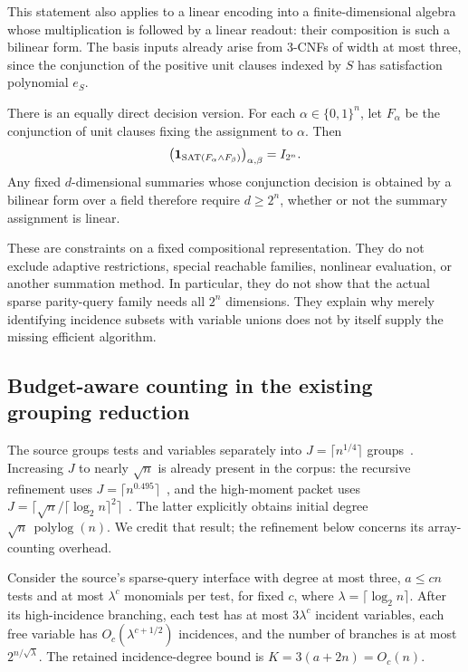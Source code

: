 This statement also applies to a linear encoding into a finite-dimensional
algebra whose multiplication is followed by a linear readout: their
composition is such a bilinear form. The basis inputs already arise from
3-CNFs of width at most three, since the conjunction of the positive unit
clauses indexed by $S$ has satisfaction polynomial $e_S$.

There is an equally direct decision version. For each
$\alpha\in\{0,1\}^n$, let $F_\alpha$ be the conjunction of unit clauses
fixing the assignment to $\alpha$. Then
\[
 \bigl(\mathbf1_{\operatorname{SAT}(F_\alpha\wedge F_\beta)}\bigr)_{\alpha,\beta}
 =I_{2^n}.
\]
Any fixed $d$-dimensional summaries whose conjunction decision is obtained
by a bilinear form over a field therefore require $d\ge2^n$, whether or not
the summary assignment is linear.

These are constraints on a fixed compositional representation. They do not
exclude adaptive restrictions, special reachable families, nonlinear
evaluation, or another summation method. In particular, they do not show
that the actual sparse parity-query family needs all $2^n$ dimensions.
They explain why merely identifying incidence subsets with variable unions
does not by itself supply the missing efficient algorithm.

\subsection{Budget-aware counting in the existing grouping reduction}

The source groups tests and variables separately into
$J=\lceil n^{1/4}\rceil$ groups~\cite{openai}. Increasing $J$ to nearly
$\sqrt n$ is already present in the corpus: the recursive refinement uses
$J=\lceil n^{0.495}\rceil$~\cite{recursive}, and the high-moment packet uses
$J=\lceil\sqrt n/\lceil\log_2n\rceil^2\rceil$~\cite{highmoment}.
The latter explicitly obtains initial degree
$\sqrt n\,\operatorname{polylog}(n)$. We credit that result; the refinement
below concerns its array-counting overhead.

Consider the source's sparse-query interface with degree at most three,
$a\le cn$ tests and at most $\lambda^c$ monomials per test, for fixed $c$,
where $\lambda=\lceil\log_2n\rceil$. After its high-incidence branching,
each test has at most $3\lambda^c$ incident variables, each free variable
has $O_c(\lambda^{c+1/2})$ incidences, and the number of branches is at most
$2^{n/\sqrt\lambda}$. The retained incidence-degree bound is
$K=3(a+2n)=O_c(n)$.

